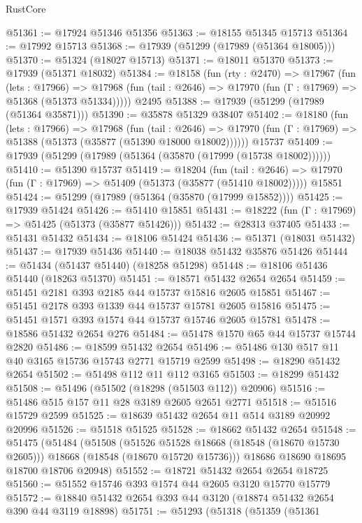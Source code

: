 \begin{lexlean}{RustCore}
\begin{coremodule}
@51361 := @17924 @51346 @51356
@51363 := @18155 @51345 @15713
@51364 := @17992 @15713
@51368 := @17939 (@51299 (@17989 (@51364 @18005)))
@51370 := @51324 (@18027 @15713)
@51371 := @18011 @51370
@51373 := @17939 (@51371 @18032)
@51384 := @18158
    (fun (rty : @2470) =>
    @17967
      (fun (lets : @17966) =>
      @17968 (fun (tail : @2646) => @17970 (fun (Γ : @17969) => @51368 (@51373 @51334)))))
    @2495
@51388 := @17939 (@51299 (@17989 (@51364 @35871)))
@51390 := @35878 @51329 @38407
@51402 := @18180
    (fun (lets : @17966) =>
    @17968
      (fun (tail : @2646) =>
      @17970 (fun (Γ : @17969) => @51388 (@51373 (@35877 (@51390 @18000 @18002))))))
    @15737
@51409 := @17939 (@51299 (@17989 (@51364 (@35870 (@17999 (@15738 @18002))))))
@51410 := @51390 @15737
@51419 := @18204
    (fun (tail : @2646) => @17970 (fun (Γ : @17969) => @51409 (@51373 (@35877 (@51410 @18002)))))
    @15851
@51424 := @51299 (@17989 (@51364 (@35870 (@17999 @15852))))
@51425 := @17939 @51424
@51426 := @51410 @15851
@51431 := @18222 (fun (Γ : @17969) => @51425 (@51373 (@35877 @51426)))
@51432 := @28313 @37405
@51433 := @51431 @51432
@51434 := @18106 @51424
@51436 := @51371 (@18031 @51432)
@51437 := @17939 @51436
@51440 := @18038 @51432 @35876 @51426
@51444 := @51434 (@51437 @51440) (@18258 @51298)
@51448 := @18106 @51436 @51440 (@18263 @51370)
@51451 := @18571 @51432 @2654 @2654
@51459 := @51451 @2181 @393 @2185 @44 @15737 @15816 @2605 @15851
@51467 := @51451 @2178 @393 @1339 @44 @15737 @15781 @2605 @15816
@51475 := @51451 @1571 @393 @1574 @44 @15737 @15746 @2605 @15781
@51478 := @18586 @51432 @2654 @276
@51484 := @51478 @1570 @65 @44 @15737 @15744 @2820
@51486 := @18599 @51432 @2654
@51496 := @51486 @130 @517 @11 @40 @3165 @15736 @15743 @2771 @15719 @2599
@51498 := @18290 @51432 @2654
@51502 := @51498 @112 @11 @112 @3165
@51503 := @18299 @51432
@51508 := @51496 (@51502 (@18298 (@51503 @112)) @20906)
@51516 := @51486 @515 @157 @11 @28 @3189 @2605 @2651 @2771
@51518 := @51516 @15729 @2599
@51525 := @18639 @51432 @2654 @11 @514 @3189 @20992 @20996
@51526 := @51518 @51525
@51528 := @18662 @51432 @2654
@51548 := @51475
    (@51484
      (@51508
        (@51526 @51528 @18668 (@18548 (@18670 @15730 @2605)))
        @18668
        (@18548 (@18670 @15720 @15736)))
      @18686
      @18690
      @18695
      @18700
      @18706
      @20948)
@51552 := @18721 @51432 @2654 @2654 @18725
@51560 := @51552 @15746 @393 @1574 @44 @2605 @3120 @15770 @15779
@51572 := @18840 @51432 @2654 @393 @44 @3120 (@18874 @51432 @2654 @390 @44 @3119 @18898)
@51751 := @51293
    (@51318
      (@51359
        (@51361

\end{coremodule}
\end{lexlean}
